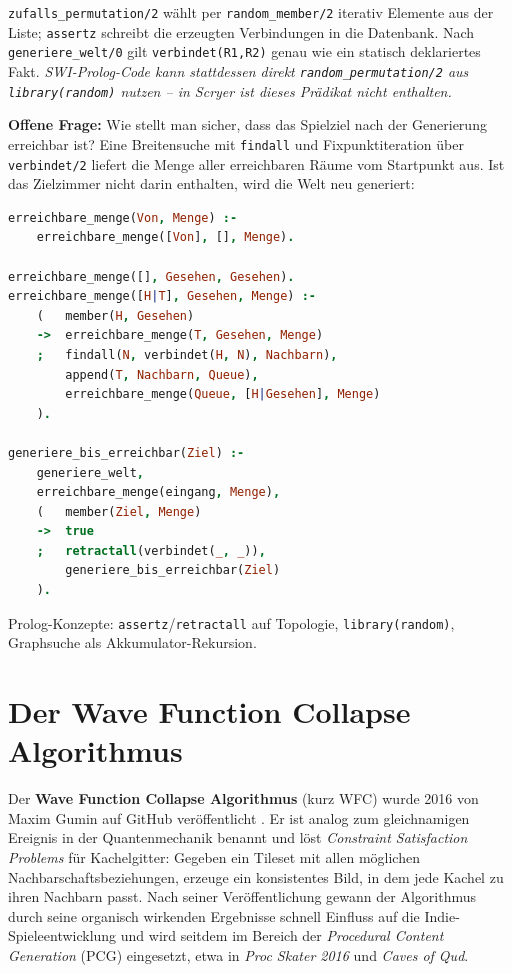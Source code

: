 \documentclass[parskip=half,a4paper,11pt]{scrreprt}
\begin{document}
\texttt{zufalls\_permutation/2} wählt per \texttt{random\_member/2} iterativ Elemente aus der Liste; \texttt{assertz} schreibt die erzeugten Verbindungen in die Datenbank. Nach \texttt{generiere\_welt/0} gilt \texttt{verbindet(R1,R2)} genau wie ein statisch deklariertes Fakt. \textit{SWI-Prolog-Code kann stattdessen direkt \texttt{random\_permutation/2} aus \texttt{library(random)} nutzen -- in Scryer ist dieses Prädikat nicht enthalten.}

\textbf{Offene Frage:} Wie stellt man sicher, dass das Spielziel nach der Generierung erreichbar ist? Eine Breitensuche mit \texttt{findall} und Fixpunktiteration über \texttt{verbindet/2} liefert die Menge aller erreichbaren Räume vom Startpunkt aus. Ist das Zielzimmer nicht darin enthalten, wird die Welt neu generiert:

\begin{lstlisting}[language=Prolog, caption={Erreichbarkeitsgarantie per Fixpunktiteration}]
erreichbare_menge(Von, Menge) :-
    erreichbare_menge([Von], [], Menge).

erreichbare_menge([], Gesehen, Gesehen).
erreichbare_menge([H|T], Gesehen, Menge) :-
    (   member(H, Gesehen)
    ->  erreichbare_menge(T, Gesehen, Menge)
    ;   findall(N, verbindet(H, N), Nachbarn),
        append(T, Nachbarn, Queue),
        erreichbare_menge(Queue, [H|Gesehen], Menge)
    ).

generiere_bis_erreichbar(Ziel) :-
    generiere_welt,
    erreichbare_menge(eingang, Menge),
    (   member(Ziel, Menge)
    ->  true
    ;   retractall(verbindet(_, _)),
        generiere_bis_erreichbar(Ziel)
    ).
\end{lstlisting}

Prolog-Konzepte: \texttt{assertz}/\texttt{retractall} auf Topologie, \texttt{library(random)}, Graphsuche als Akkumulator-Rekursion.

\section{Der Wave Function Collapse Algorithmus}

Der \textbf{Wave Function Collapse Algorithmus} (kurz WFC) wurde 2016 von Maxim Gumin auf GitHub veröffentlicht \citep{Gumin2016}. Er ist analog zum gleichnamigen Ereignis in der Quantenmechanik benannt und löst \textit{Constraint Satisfaction Problems} für Kachelgitter: Gegeben ein Tileset mit allen möglichen Nachbarschaftsbeziehungen, erzeuge ein konsistentes Bild, in dem jede Kachel zu ihren Nachbarn passt. Nach seiner Veröffentlichung gewann der Algorithmus durch seine organisch wirkenden Ergebnisse schnell Einfluss auf die Indie-Spieleentwicklung und wird seitdem im Bereich der \textit{Procedural Content Generation} (PCG) eingesetzt, etwa in \textit{Proc Skater 2016} und \textit{Caves of Qud}.
\end{document}
